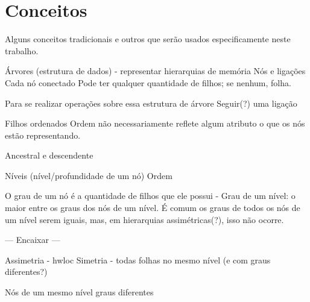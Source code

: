 \chapter{Conceitos}

Alguns conceitos tradicionais e outros que serão usados especificamente neste trabalho.

Árvores (estrutura de dados) - representar hierarquias de memória
Nós e ligações
Cada nó conectado 
Pode ter qualquer quantidade de filhos; se nenhum, folha.

Para se realizar operações sobre essa estrutura de árvore
Seguir(?) uma ligação

Filhos ordenados
Ordem não necessariamente reflete algum atributo  o que os nós estão representando.

Ancestral e descendente

Níveis (nível/profundidade de um nó)
Ordem

O grau de um nó é a quantidade de filhos que ele possui
- Grau de um nível: o maior entre os graus dos nós de um nível.
É comum os graus de todos os nós de um nível serem iguais, mas, em hierarquias assimétricas(?), isso não ocorre.


--- Encaixar ---

Assimetria - hwloc
Simetria - todas folhas no mesmo nível (e com graus diferentes?)

Nós de um mesmo nível  graus diferentes